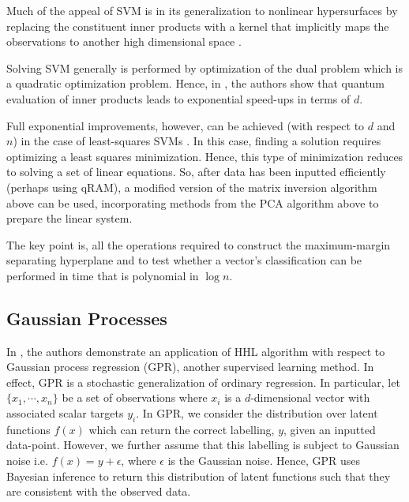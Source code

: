 \documentclass[main.tex]{subfiles}
\begin{document}
Much of the appeal of SVM is in its generalization to nonlinear hypersurfaces by replacing the constituent inner products with a kernel that implicitly maps the observations to another high dimensional space \cite{rudin}.%

Solving SVM generally is performed by optimization of the dual problem which is a quadratic optimization problem. Hence, in \cite{rebentrost2014quantum}, the authors show that quantum evaluation of inner products leads to exponential speed-ups in terms of $d$. 

Full exponential improvements, however, can be achieved (with respect to $d$ and $n$) in the case of least-squares SVMs \cite{rebentrost2014quantum}. In this case, finding a solution requires optimizing a least squares minimization. Hence, this type of minimization reduces to solving a set of linear equations. So, after data has been inputted efficiently (perhaps using qRAM), a modified version of the matrix inversion algorithm above can be used, incorporating methods from the PCA algorithm above to prepare the linear system.

The key point is, all the operations required to construct the maximum-margin separating hyperplane and to test whether a vector's classification can be performed in time that is polynomial in $\log n$.


\subsection{Gaussian Processes}

In \cite{zhao2018quantum}, the authors demonstrate an application of HHL algorithm with respect to Gaussian process regression (GPR), another supervised learning method. In effect, GPR is a stochastic generalization of ordinary regression. In particular, let $\{ x_1 , \cdots , x_n \}$ be a set of observations where $x_i$ is a $d$-dimensional vector with associated scalar targets $y_i$. In GPR, we consider the distribution over latent functions $f(x)$ which can return the correct labelling, $y$, given an inputted data-point. However, we further assume that this labelling is subject to Gaussian noise i.e. $f(x) = y + \epsilon$, where $\epsilon$ is the Gaussian noise. Hence, GPR uses Bayesian inference to return this distribution of latent functions such that they are consistent with the observed data. 
\end{document}
